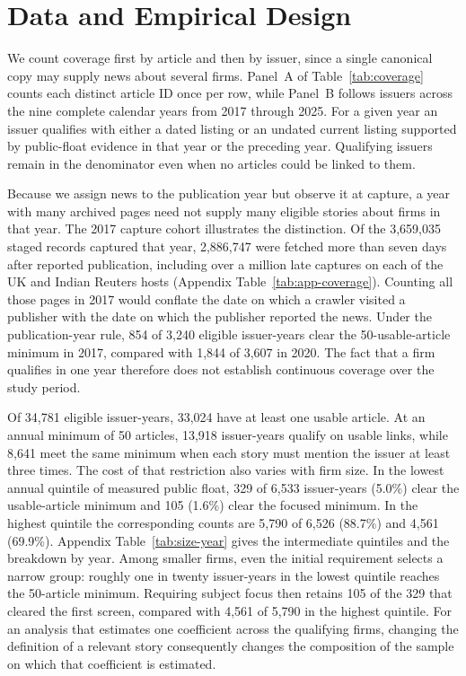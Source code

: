 \section{Data and Empirical Design}
\label{sec:design}

We count coverage first by article and then by issuer, since a single
canonical copy may supply news about several firms. Panel~A of
Table~\ref{tab:coverage} counts each distinct article ID once per row,
while Panel~B follows issuers across the nine complete calendar years
from 2017 through 2025. For a given year an issuer qualifies with
either a dated listing or an
undated current listing supported by public-float evidence in that year
or the preceding year. Qualifying issuers remain in the denominator
even when no articles could be linked to them.

Because we assign news to the publication year but observe it at
capture, a year with many archived pages need not supply many eligible
stories about firms in that year. The 2017 capture cohort illustrates
the distinction. Of the 3,659,035 staged records captured that year,
2,886,747 were fetched more than seven days after reported publication,
including over a million late captures on each of the UK and Indian
Reuters hosts (Appendix Table~\ref{tab:app-coverage}). Counting all
those pages in 2017 would conflate the date on which a crawler visited
a publisher with the date on which the publisher reported the news.
Under the publication-year rule, 854 of 3,240 eligible issuer-years
clear the 50-usable-article minimum in 2017, compared with 1,844 of
3,607 in 2020. The fact that a firm qualifies in one year therefore
does not establish continuous coverage over the study period.

Of 34,781 eligible issuer-years, 33,024 have at least one usable article.
At an annual minimum of 50 articles, 13,918 issuer-years qualify on
usable links, while 8,641 meet the same minimum when each story must
mention the issuer at least three times. The cost of that restriction
also varies with firm size. In the lowest annual quintile of measured
public float, 329 of 6,533 issuer-years (5.0\%) clear the usable-article
minimum and 105 (1.6\%) clear the focused minimum. In the highest
quintile the corresponding counts are 5,790 of 6,526 (88.7\%) and
4,561 (69.9\%). Appendix Table~\ref{tab:size-year} gives the
intermediate quintiles and the breakdown by year. Among smaller firms,
even the initial requirement selects a narrow group: roughly one in
twenty issuer-years in the lowest quintile reaches the 50-article minimum.
Requiring subject focus then retains 105 of the 329 that cleared the
first screen, compared with 4,561 of 5,790 in the highest quintile.
For an analysis that estimates one coefficient across the qualifying
firms, changing the definition of a relevant story consequently changes
the composition of the sample on which that coefficient is estimated.

